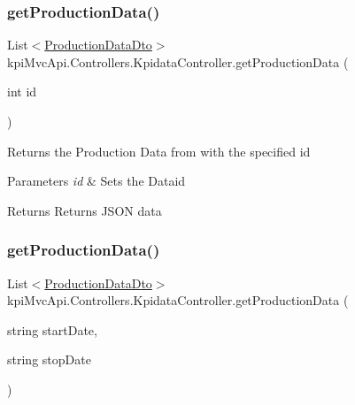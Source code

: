 \subsubsection{\texorpdfstring{get\+Production\+Data()}{getProductionData()}\hspace{0.1cm}{\footnotesize\ttfamily [4/6]}}
{\footnotesize\ttfamily List$<$\hyperlink{classkpi_mvc_api_1_1_data_transfer_objects_1_1_production_data_dto}{Production\+Data\+Dto}$>$ kpi\+Mvc\+Api.\+Controllers.\+Kpidata\+Controller.\+get\+Production\+Data (\begin{DoxyParamCaption}\item[{int}]{id }\end{DoxyParamCaption})\hspace{0.3cm}{\ttfamily [inline]}}



Returns the Production Data from with the specified id 


\begin{DoxyParams}{Parameters}
{\em id} & Sets the Dataid\\
\hline
\end{DoxyParams}
\begin{DoxyReturn}{Returns}
Returns J\+S\+ON data
\end{DoxyReturn}
\mbox{\label{classkpi_mvc_api_1_1_controllers_1_1_kpidata_controller_a27722d65abe0781d4b670c84c2e07a76}} 
\subsubsection{\texorpdfstring{get\+Production\+Data()}{getProductionData()}\hspace{0.1cm}{\footnotesize\ttfamily [5/6]}}
{\footnotesize\ttfamily List$<$\hyperlink{classkpi_mvc_api_1_1_data_transfer_objects_1_1_production_data_dto}{Production\+Data\+Dto}$>$ kpi\+Mvc\+Api.\+Controllers.\+Kpidata\+Controller.\+get\+Production\+Data (\begin{DoxyParamCaption}\item[{string}]{start\+Date,  }\item[{string}]{stop\+Date }\end{DoxyParamCaption})\hspace{0.3cm}{\ttfamily [inline]}}



